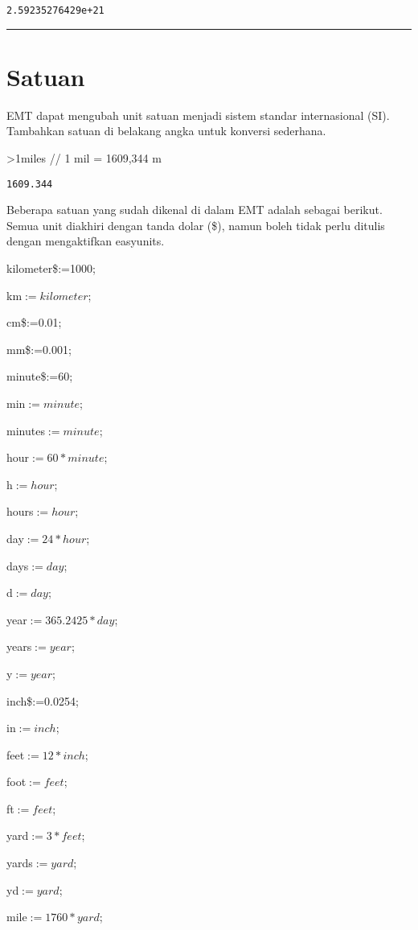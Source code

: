 \documentclass[
]{book}
\begin{document}
\begin{verbatim}
2.59235276429e+21
\end{verbatim}

\begin{center}\rule{0.5\linewidth}{0.5pt}\end{center}

\chapter{Satuan}\label{satuan}

EMT dapat mengubah unit satuan menjadi sistem standar internasional (SI). Tambahkan satuan di belakang angka untuk konversi sederhana.

\textgreater1miles // 1 mil = 1609,344 m

\begin{verbatim}
1609.344
\end{verbatim}

Beberapa satuan yang sudah dikenal di dalam EMT adalah sebagai berikut. Semua unit diakhiri dengan tanda dolar (\$), namun boleh tidak perlu ditulis dengan mengaktifkan easyunits.

kilometer\$:=1000;

km\(:=kilometer\);

cm\$:=0.01;

mm\$:=0.001;

minute\$:=60;

min\(:=minute\);

minutes\(:=minute\);

hour\(:=60*minute\);

h\(:=hour\);

hours\(:=hour\);

day\(:=24*hour\);

days\(:=day\);

d\(:=day\);

year\(:=365.2425*day\);

years\(:=year\);

y\(:=year\);

inch\$:=0.0254;

in\(:=inch\);

feet\(:=12*inch\);

foot\(:=feet\);

ft\(:=feet\);

yard\(:=3*feet\);

yards\(:=yard\);

yd\(:=yard\);

mile\(:=1760*yard\);
\end{document}
